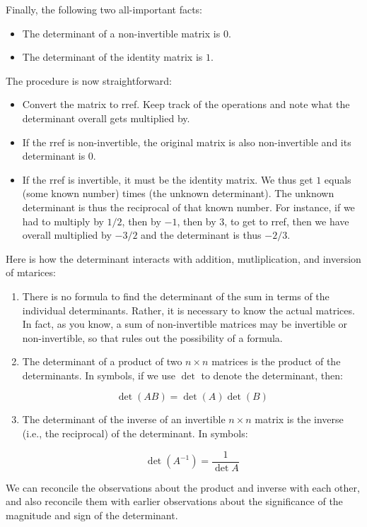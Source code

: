 \documentclass[10pt]{amsart}
\begin{document}
Finally, the following two all-important facts:

\begin{itemize}
\item The determinant of a non-invertible matrix is $0$.
\item The determinant of the identity matrix is $1$.
\end{itemize}

The procedure is now straightforward:

\begin{itemize}
\item Convert the matrix to rref. Keep track of the operations and
  note what the determinant overall gets multiplied by.
\item If the rref is non-invertible, the original matrix is also
  non-invertible and its determinant is $0$.
\item If the rref is invertible, it must be the identity matrix. We
  thus get $1$ equals (some known number) times (the unknown
  determinant). The unknown determinant is thus the reciprocal of that
  known number. For instance, if we had to multiply by $1/2$, then by
  $-1$, then by $3$, to get to rref, then we have overall multiplied
  by $-3/2$ and the determinant is thus $-2/3$.
\end{itemize}

Here is how the determinant interacts with addition, mutliplication,
and inversion of mtarices:

\begin{enumerate}
\item There is no formula to find the determinant of the sum in terms
  of the individual determinants. Rather, it is necessary to know the
  actual matrices. In fact, as you know, a sum of non-invertible
  matrices may be invertible or non-invertible, so that rules out the
  possibility of a formula.
\item The determinant of a product of two $n \times n$ matrices is the
  product of the determinants. In symbols, if we use $\det$ to denote
  the determinant, then:

  $$\det(AB) = \det(A)\det(B)$$
\item The determinant of the inverse of an invertible $n \times n$
  matrix is the inverse (i.e., the reciprocal) of the determinant. In
  symbols:

  $$\det(A^{-1}) = \frac{1}{\det A}$$
\end{enumerate}

We can reconcile the observations about the product and inverse with
each other, and also reconcile them with earlier observations about
the significance of the magnitude and sign of the determinant.
\end{document}
